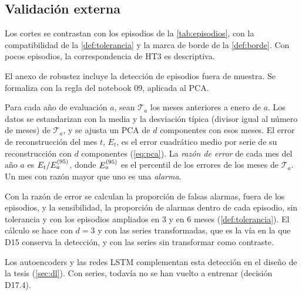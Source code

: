 \subsection{Validación externa}
\label{sec:met-validacion}

Los cortes se contrastan con los episodios de la \cref{tab:episodios}, con la compatibilidad de la
\cref{def:tolerancia} y la marca de borde de la \cref{def:borde}. Con pocos episodios, la
correspondencia de HT3 es descriptiva.

El anexo de robustez incluye la detección de episodios fuera de muestra. Se formaliza con la regla
del notebook 09, aplicada al PCA.

\begin{definicion}\label{def:walkforward}
Para cada año de evaluación $a$, sean $\mathcal{T}_a$ los meses anteriores a enero de $a$. Los datos
se estandarizan con la media y la desviación típica (divisor igual al número de meses) de
$\mathcal{T}_a$, y se ajusta un PCA de $d$ componentes con esos meses. El error de reconstrucción
del mes $t$, $E_t$, es el error cuadrático medio por serie de su reconstrucción con $d$ componentes
(\cref{eq:pca}). La \emph{razón de error} de cada mes del año $a$ es $E_t/E^{(95)}_a$, donde
$E^{(95)}_a$ es el percentil \percentilWalkforward{} de los errores de los meses de $\mathcal{T}_a$. Un mes con razón
mayor que uno es una \emph{alarma}.
\end{definicion}

Con la razón de error se calculan la proporción de falsas alarmas, fuera de los episodios, y la
sensibilidad, la proporción de alarmas dentro de cada episodio, sin tolerancia y con los episodios
ampliados en 3 y en 6 meses (\cref{def:tolerancia}). El cálculo se hace con $d=3$ y con las series
transformadas, que es la vía en la que D15 conserva la detección, y con las series sin transformar
como contraste.

Los autoencoders y las redes LSTM complementan esta detección en el diseño de la tesis
(\cref{sec:dl}). Con \nSeries{} series, todavía no se han vuelto a entrenar (decisión D17.4).

